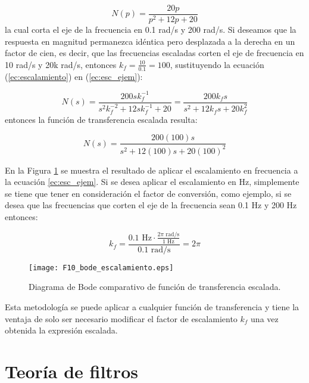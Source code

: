 	\begin{equation}
		N(p) = \frac{20p}{p^{2} + 12p + 20}
	\label{ec:esc_ejem}
	\end{equation}
	la cual corta el eje de la frecuencia en 0.1 rad/s y 200 rad/s. Si deseamos que la respuesta en magnitud permanezca idéntica pero desplazada a la derecha en un factor de cien, es decir, que las frecuencias escaladas corten el eje de frecuencia en 10 rad/s y 20k rad/s, entonces $k_{f} = \frac{10}{0.1} = 100$, sustituyendo la ecuación (\ref{ec:escalamiento}) en (\ref{ec:esc_ejem}):

	\begin{equation}
		N(s) = \frac{200sk_{f}^{-1}}{s^{2}k^{-2}_{f} + 12sk^{-1}_{f} + 20} = \frac{200k_{f}s}{s^{2} + 12 k_{f} s + 20 k^{2}_{f}}
	\end{equation}
	entonces la función de transferencia escalada resulta:

	\begin{equation}
		N(s)  = \frac{200(100)s}{s^{2} + 12(100)s + 20(100)^{2}}
	\end{equation}
	
	En la Figura \ref{fig:F10_bode_escalamiento} se muestra el resultado de aplicar el escalamiento en frecuencia a la ecuación \ref{ec:esc_ejem}. Si se desea aplicar el escalamiento en Hz, simplemente se tiene que tener en consideración el factor de conversión, como ejemplo, si se desea que las frecuencias que corten el eje de la frecuencia sean 0.1 Hz y 200 Hz entonces:
	
	\begin{equation}
		k_{f} = \frac{0.1 \,\,\mathrm{Hz} \cdot \frac{2 \pi \,\,\mathrm{rad/s}}{1 \,\,\mathrm{Hz}}}{0.1 \,\,\mathrm{rad/s}} = 2 \pi
	\end{equation}
	
	\begin{figure}[hbtp]
		\caption{Diagrama de Bode comparativo de función de transferencia escalada.} 
		\label{fig:F10_bode_escalamiento}
		\centering
		\texttt{[image: F10\_bode\_escalamiento.eps]}
	\end{figure}
	
	Esta metodología se puede aplicar a cualquier función de transferencia y tiene la ventaja de solo ser necesario modificar el factor de escalamiento $k_{f}$ una vez obtenida la expresión escalada.
	\section{Teoría de filtros}
	
